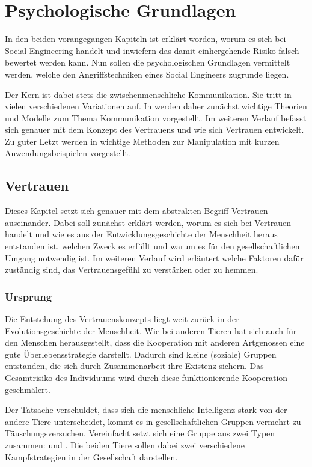 \section{Psychologische Grundlagen}\label{sec:psychologische_grundlagen}

In den beiden vorangegangen Kapiteln ist erklärt worden, worum es sich bei Social Engineering handelt und inwiefern das damit einhergehende Risiko falsch bewertet werden kann. Nun sollen die psychologischen Grundlagen vermittelt werden, welche den Angriffstechniken eines Social Engineers zugrunde liegen.

Der Kern ist dabei stets die zwischenmenschliche Kommunikation. Sie tritt in vielen verschiedenen Variationen
auf. In  werden daher zunächst wichtige Theorien und Modelle zum Thema Kommunikation vorgestellt. Im weiteren Verlauf befasst sich  genauer mit dem Konzept des Vertrauens und wie sich Vertrauen entwickelt. Zu guter Letzt werden in  wichtige Methoden zur Manipulation mit kurzen Anwendungsbeispielen vorgestellt.

\subsection{Vertrauen}\label{sec:vertrauen}
Dieses Kapitel setzt sich genauer mit dem abstrakten Begriff Vertrauen auseinander. Dabei soll zunächst erklärt werden, worum es sich bei Vertrauen handelt und wie es aus der Entwicklungsgeschichte der Menschheit heraus entstanden ist, welchen Zweck es erfüllt und warum es für den gesellschaftlichen Umgang notwendig ist.
Im weiteren Verlauf wird erläutert welche Faktoren dafür zuständig sind, das Vertrauensgefühl zu verstärken oder zu hemmen.

\subsubsection{Ursprung}
Die Entstehung des Vertrauenskonzepts liegt weit zurück in der Evolutionsgeschichte der Menschheit.
Wie bei anderen Tieren hat sich auch für den Menschen herausgestellt, dass die Kooperation mit anderen Artgenossen eine gute Überlebensstrategie darstellt.
Dadurch sind kleine (soziale) Gruppen entstanden, die sich durch Zusammenarbeit ihre Existenz sichern.
Das Gesamtrisiko des Individuums wird durch diese funktionierende Kooperation geschmälert.
\citep{liars-and-outliers}

Der Tatsache verschuldet, dass sich die menschliche Intelligenz stark von der andere Tiere unterscheidet, kommt es in gesellschaftlichen Gruppen vermehrt zu Täuschungsversuchen. Vereinfacht setzt sich eine Gruppe aus zwei Typen zusammen:  und .
Die beiden Tiere sollen dabei zwei verschiedene Kampfstrategien in der Gesellschaft darstellen.

